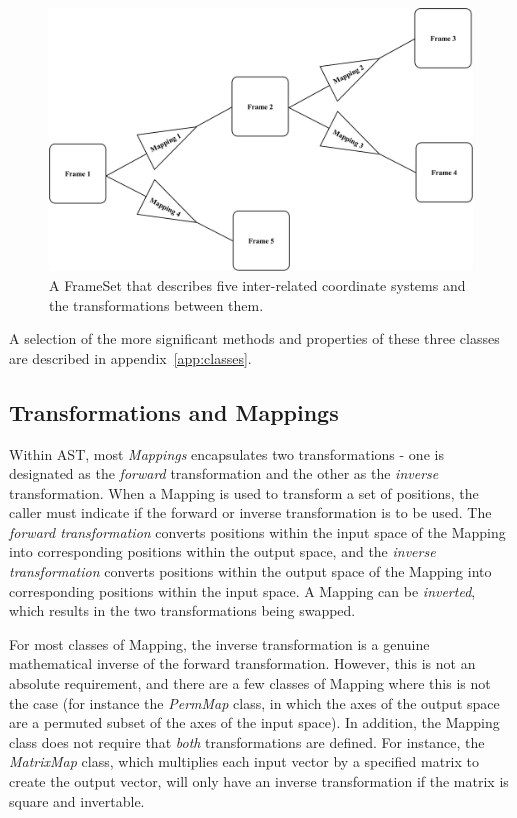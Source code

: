 \documentclass[final,authoryear,5p,times,twocolumn]{elsarticle}
\begin{document}
\begin{figure}[h]
\centering
\includegraphics[width=\columnwidth]{complex-frameset}
\caption{A FrameSet that describes five inter-related coordinate systems
and the transformations between them. }
\label{fig:complex-frameset}
\end{figure}

A selection of the more significant methods and properties of these
three classes are described in appendix~\ref{app:classes}.

\subsection{Transformations and Mappings}
\label{sec:mappings}
Within AST, most \emph{Mappings} encapsulates two transformations - one is
designated as the \emph{forward} transformation and the other as the
\emph{inverse} transformation. When a Mapping is used to transform a set
of positions, the caller must indicate if the forward or inverse
transformation is to be used. The \emph{forward transformation} converts
positions within the input space of the Mapping into corresponding
positions within the output space, and the \emph{inverse transformation}
converts positions within the output space of the Mapping into corresponding
positions within the input space. A Mapping can be \emph{inverted}, which
results in the two transformations being swapped.

For most classes of Mapping, the inverse transformation is a genuine
mathematical inverse of the forward transformation. However, this is not
an absolute requirement, and there are a few classes of Mapping where
this is not the case (for instance the \emph{PermMap} class, in which the
axes of the output space are a permuted subset of the axes of the input
space). In addition, the Mapping class does not require that \emph{both}
transformations are defined. For instance, the \emph{MatrixMap} class, which
multiplies each input vector by a specified matrix to create the output
vector, will only have an inverse transformation if the matrix is square
and invertable.
\end{document}
